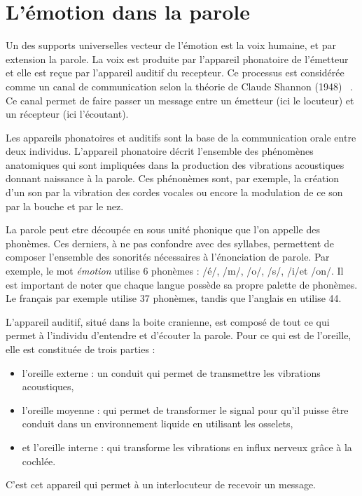 \section{L'émotion dans la parole}
Un des supports universelles vecteur de l'émotion est la voix humaine, et par extension la parole.
La voix est produite par l'appareil phonatoire de l'émetteur et elle est reçue par l'appareil auditif du recepteur. Ce processus est considérée comme un canal de communication selon la théorie de Claude Shannon (1948) ~\cite{Shannon1948}. Ce canal permet de faire passer un message entre un émetteur (ici le locuteur) et un récepteur (ici l'écoutant).

Les appareils phonatoires et auditifs sont la base de la communication orale entre deux individus. L'appareil phonatoire décrit l'ensemble des phénomènes anatomiques qui sont impliquées dans la production des vibrations acoustiques donnant naissance à la parole. Ces phénonèmes sont, par exemple, la création d'un son par la vibration des cordes vocales ou encore la modulation de ce son par la bouche et par le nez.

La parole peut etre découpée en sous unité phonique que l'on appelle des phonèmes. Ces derniers, à ne pas confondre avec des syllabes, permettent de composer l'ensemble des sonorités nécessaires à l'énonciation de parole.
Par exemple, le mot \textit{émotion} utilise 6 phonèmes : /é/, /m/, /o/, /s/, /i/et /on/.
Il est important de noter que chaque langue possède sa propre palette de phonèmes. Le français par exemple utilise 37 phonèmes, tandis que l'anglais en utilise 44.

L'appareil auditif, situé dans la boite cranienne, est composé de tout ce qui permet à l'individu d'entendre et d'écouter la parole. Pour ce qui est de l'oreille, elle est constituée de trois parties :
\begin{itemize}
  \item l'oreille externe : un conduit qui permet de transmettre les vibrations acoustiques,
  \item l'oreille moyenne : qui permet de transformer le signal pour qu'il puisse être conduit dans un environnement liquide en utilisant les osselets,
  \item et l'oreille interne : qui transforme les vibrations en influx nerveux grâce à la cochlée.
\end{itemize}
C'est cet appareil qui permet à un interlocuteur de recevoir un message.

